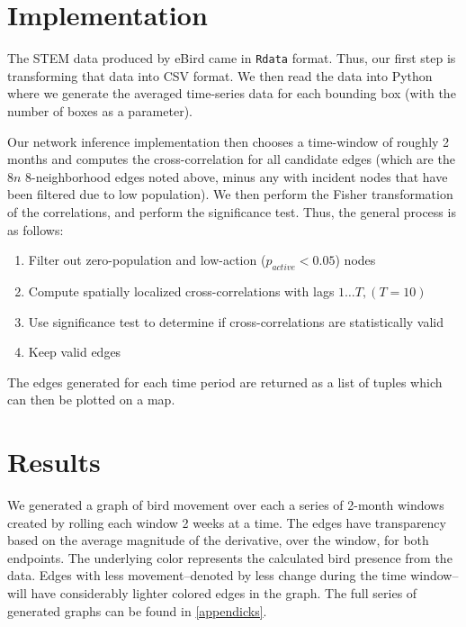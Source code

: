 \section{Implementation}
The STEM data produced by eBird came in \texttt{Rdata} format. Thus, our first step is transforming that data into CSV format. We then read the data into Python where we generate the averaged time-series data for each bounding box (with the number of boxes as a parameter). 

Our network inference implementation then chooses a time-window of roughly 2 months and computes the cross-correlation for all candidate edges (which are the $8n$ 8-neighborhood edges noted above, minus any with incident nodes that have been filtered due to low population). We then perform the Fisher transformation of the correlations, and perform the significance test. Thus, the general process is as follows:

\begin{enumerate}
\item Filter out zero-population and low-action ($p_{active} < 0.05$) nodes
\item Compute spatially localized cross-correlations with lags $1\dots T, (T=10)$
\item Use significance test to determine if cross-correlations are statistically valid
\item Keep valid edges
\end{enumerate}

The edges generated for each time period are returned as a list of tuples which can then be plotted on a map.

\section{Results}
We generated a graph of bird movement over each a series of 2-month windows created by rolling each window 2 weeks at a time.
The edges have transparency based on the average magnitude of the derivative, over the window, for both endpoints.
The underlying color represents the calculated bird presence from the data.
Edges with less movement--denoted by less change during the time window--will have considerably lighter colored edges in the graph.
The full series of generated graphs can be found in \ref{appendicks}.


